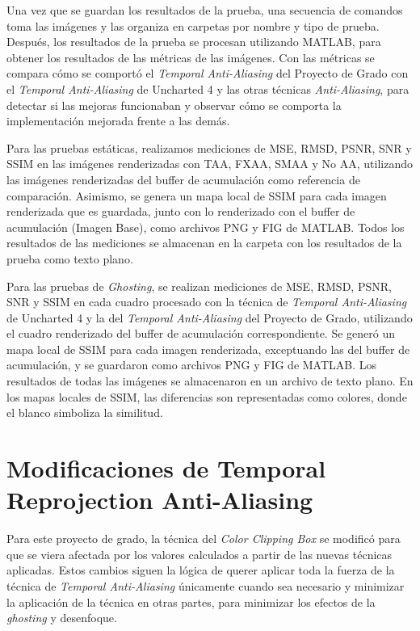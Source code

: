 \documentclass[pregrado]{tesis-usb} %
\begin{document}
Una vez que se guardan los resultados de la prueba, una secuencia de comandos toma las imágenes y las organiza en carpetas por nombre y tipo de prueba. Después, los resultados de la prueba se procesan utilizando MATLAB, para obtener los resultados de las métricas de las imágenes. Con las métricas se compara cómo se comportó el \textit{Temporal Anti-Aliasing} del Proyecto de Grado con el \textit{Temporal Anti-Aliasing} de Uncharted 4 y las otras técnicas \textit{Anti-Aliasing}, para detectar si las mejoras funcionaban y observar cómo se comporta la implementación mejorada frente a las demás.

Para las pruebas estáticas, realizamos mediciones de MSE, RMSD, PSNR, SNR y SSIM en las imágenes renderizadas con TAA, FXAA, SMAA y No AA, utilizando las imágenes renderizadas del buffer de acumulación como referencia de comparación. Asimismo, se genera un mapa local de SSIM para cada imagen renderizada que es guardada, junto con lo renderizado con el buffer de acumulación (Imagen Base), como archivos PNG y FIG de MATLAB. Todos los resultados de las mediciones se almacenan en la carpeta con los resultados de la prueba como texto plano.

Para las pruebas de \textit{Ghosting}, se realizan mediciones de MSE, RMSD, PSNR, SNR y SSIM en cada cuadro procesado con la técnica de \textit{Temporal Anti-Aliasing} de Uncharted 4 y la del \textit{Temporal Anti-Aliasing} del Proyecto de Grado, utilizando el cuadro renderizado del buffer de acumulación correspondiente. Se generó un mapa local de SSIM para cada imagen renderizada, exceptuando las del buffer de acumulación, y se guardaron como archivos PNG y FIG de MATLAB. Los resultados de todas las imágenes se almacenaron en un archivo de texto plano. En los mapas locales de SSIM, las diferencias son representadas como colores, donde el blanco simboliza la similitud.


\section[Modificaciones de Temporal Reprojection Anti-Aliasing ]{Modificaciones de Temporal Reprojection Anti-Aliasing }
Para este proyecto de grado, la técnica del \textit{Color Clipping Box} se modificó para que se viera afectada por los valores calculados a partir de las nuevas técnicas aplicadas. Estos cambios siguen la lógica de querer aplicar toda la fuerza de la técnica de \textit{Temporal Anti-Aliasing} únicamente cuando sea necesario y minimizar la aplicación de la técnica en otras partes, para minimizar los efectos de la \textit{ghosting} y desenfoque.
\end{document}
